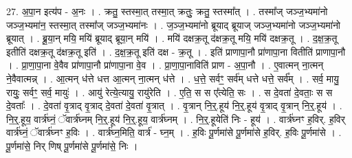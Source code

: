 \documentclass[17pt]{extarticle}
\begin{document}
27. अ॒पा॒न इत्य॑प - अ॒नः । . क्रतु॒ स्तस्मा॒त् तस्मा॒त् क्रतुः॒ क्रतु॒ स्तस्मा᳚त् । . तस्मा᳚ज् जञ्ज॒भ्यमा॑नो जञ्ज॒भ्यमा॑न॒ स्तस्मा॒त् तस्मा᳚ज् जञ्ज॒भ्यमा॑नः । . ज॒ञ्ज॒भ्यमा॑नो ब्रूयाद् ब्रूयाज् जञ्ज॒भ्यमा॑नो जञ्ज॒भ्यमा॑नो ब्रूयात् । . ब्रू॒या॒न् मयि॒ मयि॑ ब्रूयाद् ब्रूया॒न् मयि॑ । . मयि॑ दक्षक्र॒तू द॑क्षक्र॒तू मयि॒ मयि॑ दक्षक्र॒तू । . द॒क्ष॒क्र॒तू इतीति॑ दक्षक्र॒तू द॑क्षक्र॒तू इति॑ । . द॒क्ष॒क्र॒तू इति॑ दक्ष - क्र॒तू । . इति॑ प्राणापा॒नौ प्रा॑णापा॒ना वितीति॑ प्राणापा॒नौ । . प्रा॒णा॒पा॒ना वे॒वैव प्रा॑णापा॒नौ प्रा॑णापा॒ना वे॒व । . प्रा॒णा॒पा॒नाविति॑ प्राण - अ॒पा॒नौ । . ए॒वात्मन् ना॒त्मन् ने॒वैवात्मन्न् । . आ॒त्मन् ध॑त्ते धत्त आ॒त्मन् ना॒त्मन् ध॑त्ते । . ध॒त्ते॒ सर्वꣳ॒॒ सर्व॑म् धत्ते धत्ते॒ सर्व᳚म् । . सर्व॒ मायु॒ रायुः॒ सर्वꣳ॒॒ सर्व॒ मायुः॑ । . आयु॑ रेत्ये॒त्यायु॒ रायु॑रेति । . ए॒ति॒ स स ए᳚त्येति॒ सः । . स दे॒वता॑ दे॒वताः॒ स स दे॒वताः᳚ । . दे॒वता॑ वृ॒त्राद् वृ॒त्राद् दे॒वता॑ दे॒वता॑ वृ॒त्रात् । . वृ॒त्रान् नि॒र्॒.हूय॑ नि॒र्॒.हूय॑ वृ॒त्राद् वृ॒त्रान् नि॒र्॒.हूय॑ । . नि॒र्॒.हूय॒ वार्त्र॑घ्नं॒ ॅवार्त्र॑घ्नम् नि॒र्॒.हूय॑ नि॒र्॒.हूय॒ वार्त्र॑घ्नम् । . नि॒र्॒.हूयेति॑ निः - हूय॑ । . वार्त्र॑घ्नꣳ ह॒विर्. ह॒विर् वार्त्र॑घ्नं॒ ॅवार्त्र॑घ्नꣳ ह॒विः । . वार्त्र॑घ्न॒मिति॒ वार्त्र॑ - घ्न॒म् । . ह॒विः पू॒र्णमा॑से पू॒र्णमा॑से ह॒विर्. ह॒विः पू॒र्णमा॑से । . पू॒र्णमा॑से॒ निर् णिष् पू॒र्णमा॑से पू॒र्णमा॑से॒ निः । \newline
\end{document}
